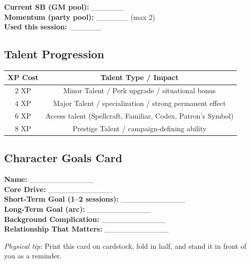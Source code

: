 \begin{tcolorbox}[colback=white,colframe=black,left=1em,right=1em,top=0.5em,bottom=0.5em]
\textbf{Current SB (GM pool):} \_\_\_\_\_\_ \\
\textbf{Momentum (party pool):} \_\_\_\_\_\_  (max 2) \\
\textbf{Used this session:} \_\_\_\_\_\_
\end{tcolorbox}

\subsection{Talent Progression}

\begin{center}
\begin{tabular}{|c|c|}
\hline
\textbf{XP Cost} & \textbf{Talent Type / Impact} \\
\hline
2 XP & Minor Talent / Perk upgrade / situational bonus \\
4 XP & Major Talent / specialization / strong permanent effect \\
6 XP & Access talent (Spellcraft, Familiar, Codex, Patron's Symbol) \\
8 XP & Prestige Talent / campaign‑defining ability \\
\hline
\end{tabular}
\end{center}

\subsection{Character Goals Card}

\begin{tcolorbox}[colback=white,colframe=black,width=\textwidth,left=1em,right=1em]
\textbf{Name:} \_\_\_\_\_\_\_\_\_\_\_\_ \\
\textbf{Core Drive:} \_\_\_\_\_\_\_\_\_\_\_\_ \\
\textbf{Short-Term Goal (1--2 sessions):} \_\_\_\_\_\_\_\_\_\_\_\_ \\
\textbf{Long-Term Goal (arc):} \_\_\_\_\_\_\_\_\_\_\_\_ \\
\textbf{Background Complication:} \_\_\_\_\_\_\_\_\_\_\_\_ \\
\textbf{Relationship That Matters:} \_\_\_\_\_\_\_\_\_\_\_\_
\end{tcolorbox}

\emph{Physical tip:} Print this card on cardstock, fold in half, and stand it in front of you as a reminder.

